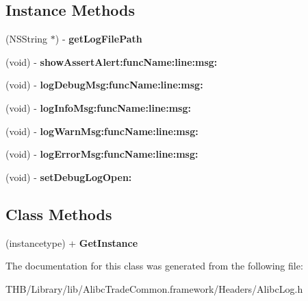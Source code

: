 \subsection*{Instance Methods}
\begin{DoxyCompactItemize}
\item 
\mbox{\label{interface_alibc_log_acb8f28889fc80a5b01a4a982e62e7068}} 
(N\+S\+String $\ast$) -\/ {\bfseries get\+Log\+File\+Path}
\item 
\mbox{\label{interface_alibc_log_ac4430508315f38a8ec6c350a8f43dd37}} 
(void) -\/ {\bfseries show\+Assert\+Alert\+:func\+Name\+:line\+:msg\+:}
\item 
\mbox{\label{interface_alibc_log_ad6a524e3856d7fe709bb15f1932a0c58}} 
(void) -\/ {\bfseries log\+Debug\+Msg\+:func\+Name\+:line\+:msg\+:}
\item 
\mbox{\label{interface_alibc_log_a88d0118fdba01c9b33f2feab64863b88}} 
(void) -\/ {\bfseries log\+Info\+Msg\+:func\+Name\+:line\+:msg\+:}
\item 
\mbox{\label{interface_alibc_log_aba50f60a86df369db13918126c58c679}} 
(void) -\/ {\bfseries log\+Warn\+Msg\+:func\+Name\+:line\+:msg\+:}
\item 
\mbox{\label{interface_alibc_log_afa15b16153e43106a6f16545758764d6}} 
(void) -\/ {\bfseries log\+Error\+Msg\+:func\+Name\+:line\+:msg\+:}
\item 
\mbox{\label{interface_alibc_log_aaab876549e2ea7199988a92e12baa891}} 
(void) -\/ {\bfseries set\+Debug\+Log\+Open\+:}
\end{DoxyCompactItemize}
\subsection*{Class Methods}
\begin{DoxyCompactItemize}
\item 
\mbox{\label{interface_alibc_log_a32867e98a51150adc437427c00b58999}} 
(instancetype) + {\bfseries Get\+Instance}
\end{DoxyCompactItemize}


The documentation for this class was generated from the following file\+:\begin{DoxyCompactItemize}
\item 
T\+H\+B/\+Library/lib/\+Alibc\+Trade\+Common.\+framework/\+Headers/Alibc\+Log.\+h\end{DoxyCompactItemize}
